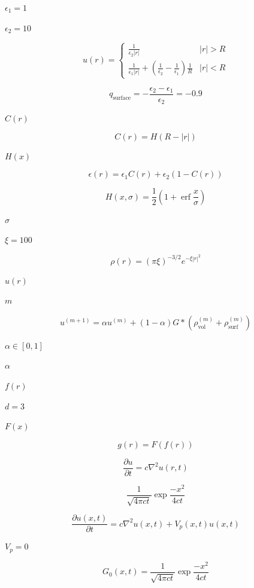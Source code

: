 \documentclass{article}
\begin{document}
$\epsilon_1 = 1$
\pagebreak

$\epsilon_2 = 10$
\pagebreak

\[
   u(r) =
          \left \lbrace
             \begin{array}{cc}
                  \frac{1}{\epsilon_2 |r|} & |r| > R \\
                  \frac{1}{\epsilon_1 |r|} + \left( \frac{1}{\epsilon_2} - \frac{1}{\epsilon_1} \right) \frac{1}{R}  & |r| < R
             \end{array}
          \right .
\]
\pagebreak

\[
   q_{\mbox{surface}} = -\frac{\epsilon_2 - \epsilon_1}{\epsilon_2} = -0.9
\]
\pagebreak

$C(r)$
\pagebreak

\[
  C(r) = H(R-|r|)
\]
\pagebreak

$H(x)$
\pagebreak

\[
   \epsilon(r) = \epsilon_1 C(r) + \epsilon_2 \left( 1 - C(r) \right)
\]
\pagebreak

\[
   H(x,\sigma) = \frac{1}{2} \left( 1 + \mathop{\mathrm{erf}} \frac{x}{\sigma} \right)
\]
\pagebreak

$\sigma$
\pagebreak

$\xi=100$
\pagebreak

\[
   \rho(r) = \left(\pi \xi \right)^{-3/2} e^{-\xi |r|^2}
\]
\pagebreak

$u(r)$
\pagebreak

$m$
\pagebreak

\[
   u^{(m+1)} = \alpha u^{(m)} + (1-\alpha) G * \left(\rho^{(m)}_{\mbox{vol}} + \rho^{(m)}_{\mbox{surf}} \right)
\]
\pagebreak

$ \alpha \in [0,1]$
\pagebreak

$\alpha$
\pagebreak

$f(r)$
\pagebreak

$d=3$
\pagebreak

$F(x)$
\pagebreak

\[
    g(r) = F(f(r))
\]
\pagebreak

\[
\frac{\partial u}{\partial t} = c \nabla^2 u(r,t)
\]
\pagebreak

\[
\frac{1}{\sqrt{4 \pi c t}}  \exp \frac{-x^2}{4 c t}
\]
\pagebreak

\[
  \frac{\partial u(x,t)}{\partial t} = c \nabla^2 u(x,t) + V_p(x,t) u(x,t)
\]
\pagebreak

$ V_p = 0 $
\pagebreak

\[
  G_0(x,t) = \frac{1}{\sqrt{4 \pi c t}} \exp \frac{-x^2}{4 c t}
\]
\pagebreak
\end{document}
